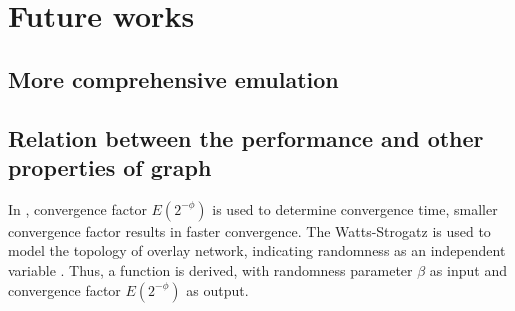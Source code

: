 \documentclass[11pt,a4paper]{article}
\begin{document}
\newpage

\section{Future works}

\subsection{More comprehensive emulation}

\subsection{Relation between the performance and other properties of graph}

In \cite{jelasity_gossip-based_2005}, convergence factor $E(2^{-\phi})$ is used to determine convergence time, smaller convergence factor results in faster convergence. The Watts-Strogatz is used to model the topology of overlay network, indicating randomness as an independent variable \cite{Watts1998}. Thus, a function is derived, with randomness parameter $\beta$ as input and convergence factor $E(2^{-\phi})$ as output.
\end{document}
